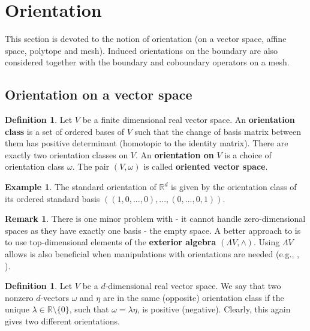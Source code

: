 \documentclass{elsarticle}
\theoremstyle{definition}
\newtheorem{definition}[theorem]{Definition}
\newtheorem{example}[theorem]{Example}
\newtheorem{remark}[theorem]{Remark}
\newcommand{\R}{\mathbb{R}} %
\begin{document}
\section{Orientation}
\label{sec:orientation}
This section is devoted to the notion of orientation (on a vector space, affine space, polytope and mesh). Induced orientations on the boundary are also considered together with the boundary and coboundary operators on a mesh.

\subsection{Orientation on a vector space}
\label{sec:orientation_space}
\begin{definition}
\label{thm:orientation_vector_space_bases}
  Let $V$ be a finite dimensional real vector space. An \textbf{orientation class} is a set of ordered bases of $V$ such that the change of basis matrix between them has positive determinant (homotopic to the identity matrix). There are exactly two orientation classes on $V$. An \textbf{orientation on} $V$ is a choice of orientation class $\omega.$ The pair $(V, \omega)$ is called \textbf{oriented vector space}.
\end{definition}
\begin{example}
  The standard orientation of $\R^d$ is given by the orientation class of its ordered standard basis $((1, 0, ..., 0), ..., (0, ..., 0, 1))$.
\end{example}
\begin{remark}
  There is one minor problem with  - it cannot handle zero-dimensional spaces as they have exactly one basis - the empty space. A better approach to is to use top-dimensional elements of the \textbf{exterior algebra} $(\Lambda V, \wedge)$. Using $\Lambda V$ allows is also beneficial when manipulations with orientations are needed (e.g., , ).
\end{remark}
\begin{definition}
\label{thm:orientation_vector_space_forms}
  Let $V$ be a $d$-dimensional real vector space. We say that two nonzero $d$-vectors $\omega$ and $\eta$ are in the same (opposite) orientation class if the unique $\lambda \in \R \setminus \{0\}$, such that $\omega = \lambda \eta$, is positive (negative). Clearly, this again gives two different orientations.
\end{definition}
\end{document}
